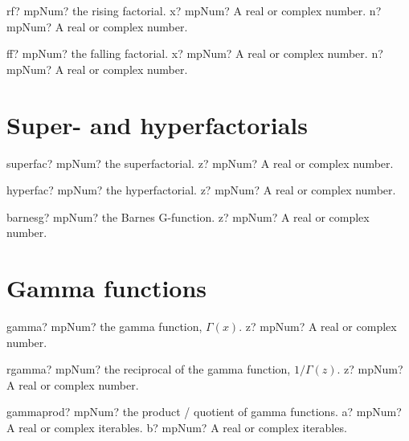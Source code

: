 \documentclass[12pt,a4paper,openany]{book}
\begin{document}
\begin{mpFunctionsExtract}
\mpFunctionTwo
{rf? mpNum? the rising factorial.}
{x? mpNum? A real or complex number.}
{n? mpNum? A real or complex number.}
\end{mpFunctionsExtract}

\begin{mpFunctionsExtract}
\mpFunctionTwo
{ff? mpNum? the falling factorial.}
{x? mpNum? A real or complex number.}
{n? mpNum? A real or complex number.}
\end{mpFunctionsExtract}

\section{Super- and hyperfactorials}

\begin{mpFunctionsExtract}
\mpFunctionOne
{superfac? mpNum? the superfactorial.}
{z? mpNum? A real or complex number.}
\end{mpFunctionsExtract}

\begin{mpFunctionsExtract}
\mpFunctionOne
{hyperfac? mpNum? the hyperfactorial.}
{z? mpNum? A real or complex number.}
\end{mpFunctionsExtract}

\begin{mpFunctionsExtract}
\mpFunctionOne
{barnesg? mpNum? the Barnes G-function.}
{z? mpNum? A real or complex number.}
\end{mpFunctionsExtract}

\section{Gamma functions}

\begin{mpFunctionsExtract}
\mpFunctionOne
{gamma? mpNum? the gamma function, $\Gamma(x)$.}
{z? mpNum? A real or complex number.}
\end{mpFunctionsExtract}

\begin{mpFunctionsExtract}
\mpFunctionOne
{rgamma? mpNum? the reciprocal of the gamma function, $1/\Gamma(z)$.}
{z? mpNum? A real or complex number.}
\end{mpFunctionsExtract}

\begin{mpFunctionsExtract}
\mpFunctionTwo
{gammaprod? mpNum?  the  product / quotient of gamma functions.}
{a? mpNum? A real or complex iterables.}
{b? mpNum? A real or complex iterables.}
\end{mpFunctionsExtract}
\end{document}
